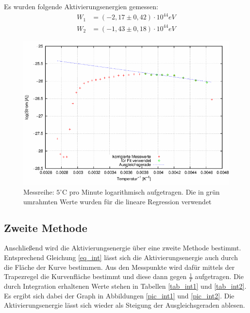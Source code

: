 Es wurden folgende Aktivierungsenergien gemessen:
\begin{align}
W_1&=(-2,17\pm 0,42)\cdot10^{44} eV\\
W_2&=(-1,43 \pm 0,18)\cdot10^{44} eV
\end{align}
\begin{figure}[H]
\includegraphics[scale=0.8]{../gnu/relax22.pdf}
\caption{Messreihe: $5^\circ$C pro Minute  logarithmisch aufgetragen. Die in grün umrahmten Werte wurden für die lineare Regression verwendet}
\label{pic_22}
\end{figure}

\subsection{Zweite Methode}
Anschließend wird die Aktivierungsenergie über eine zweite Methode bestimmt. Entsprechend Gleichung \eqref{eq_int} lässt sich die Aktivierungsenergie auch durch die Fläche der Kurve bestimmen. Aus den Messpunkte wird dafür mittels der Trapezregel die Kurvenfläche bestimmt und diese dann gegen $\frac{1}{T}$ aufgetragen. Die durch Integration erhaltenen Werte stehen in Tabellen \ref{tab_int1} und \ref{tab_int2}. Es ergibt sich dabei der Graph in Abbildungen \ref{pic_int1} und \ref{pic_int2}. Die Aktivierungsenergie lässt sich wieder als Steigung der Ausgleichsgeraden ablesen.

